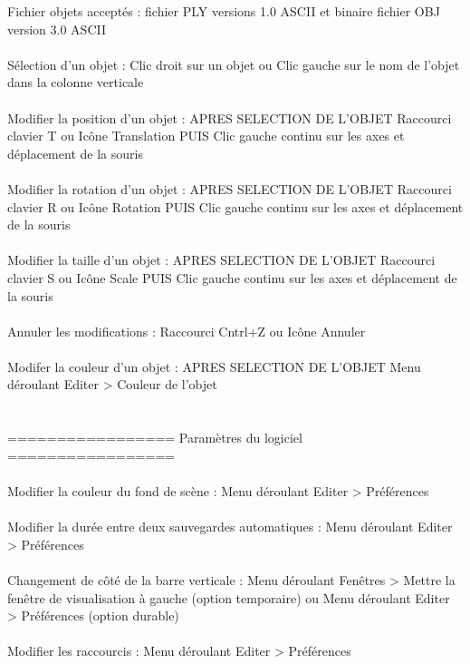 		Fichier objets acceptés : fichier PLY versions 1.0 ASCII et binaire
			       		  fichier OBJ version  3.0 ASCII
\\ \\
Sélection d'un objet :			Clic droit sur un objet
	       	     			ou     Clic gauche sur le nom de l'objet dans la colonne verticale
\\ \\
Modifier la position d'un objet :	APRES SELECTION DE L'OBJET
	    	     	  		Raccourci clavier T
					ou     Icône Translation
					PUIS Clic gauche continu sur les axes et déplacement de la souris
\\ \\
Modifier la rotation d'un objet :	APRES SELECTION DE L'OBJET
	    	     	  		Raccourci clavier R
					ou     Icône Rotation
					PUIS Clic gauche continu sur les axes et déplacement de la souris
\\ \\
Modifier la taille d'un objet :		APRES SELECTION DE L'OBJET
	    	     	  		Raccourci clavier S
					ou     Icône Scale
					PUIS Clic gauche continu sur les axes et déplacement de la souris
\\ \\
Annuler les modifications :		Raccourci Cntrl+Z
	    		  		ou     Icône Annuler
\\ \\
Modifer la couleur d'un objet :		APRES SELECTION DE L'OBJET
	   	   	      		Menu déroulant Editer > Couleur de l'objet
\\ \\ \\
================= Paramètres du logiciel =================
\\ \\
Modifier la couleur du fond de scène :	Menu déroulant Editer > Préférences
\\ \\
Modifier la durée entre deux 
	 sauvegardes automatiques :	Menu déroulant Editer > Préférences
\\ \\
Changement de côté de la barre 
	 verticale :			Menu déroulant Fenêtres > Mettre la fenêtre de visualisation à gauche (option temporaire)
	 	   			ou     Menu déroulant Editer > Préférences (option durable)
\\ \\
Modifier les raccourcis :		Menu déroulant Editer > Préférences
\\ \\
